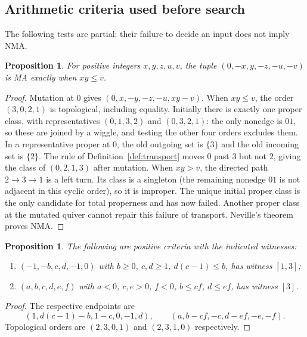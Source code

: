 \documentclass[11pt]{amsart}
\newtheorem{proposition}[theorem]{Proposition}
\theoremstyle{definition}\newtheorem{definition}[theorem]{Definition}
\theoremstyle{remark}\newtheorem{remark}[theorem]{Remark}
\begin{document}
\subsection{Arithmetic criteria used before search}
The following tests are partial: their failure to decide an input does not imply NMA.
\begin{proposition}\label{prop:five}
For positive integers $x,y,z,u,v$, the tuple $(0,-x,y,-z,-u,-v)$ is MA exactly when $xy\le v$.
\end{proposition}
\begin{proof}
Mutation at $0$ gives $(0,x,-y,-z,-u,xy-v)$. When $xy\le v$, the order $(3,0,2,1)$ is topological, including equality. Initially there is exactly one proper class, with representatives $(0,1,3,2)$ and $(0,3,2,1)$: the only nonedge is $01$, so these are joined by a wiggle, and testing the other four orders excludes them. In a representative proper at $0$, the old outgoing set is $\{3\}$ and the old incoming set is $\{2\}$. The rule of Definition~\ref{def:transport} moves $0$ past $3$ but not $2$, giving the class of $(0,2,1,3)$ after mutation. When $xy>v$, the directed path $2\to3\to1$ is a left turn. Its class is a singleton (the remaining nonedge $01$ is not adjacent in this cyclic order), so it is improper. The unique initial proper class is the only candidate for total properness and has now failed. Another proper class at the mutated quiver cannot repair this failure of transport. Neville's theorem proves NMA.
\end{proof}
\begin{proposition}\label{prop:positive}
The following are positive criteria with the indicated witnesses:
\begin{enumerate}[label=(\roman*)]
\item $(-1,-b,c,d,-1,0)$ with $b\ge0$, $c,d\ge1$, $d(c-1)\le b$, has witness $[1,3]$;
\item $(a,b,c,d,e,f)$ with $a<0$, $c,e>0$, $f<0$, $b\le cf$, $d\le ef$, has witness $[3]$.
\end{enumerate}
\end{proposition}
\begin{proof}
The respective endpoints are
\[
 (1,d(c-1)-b,1-c,0,-1,d),\qquad
 (a,b-cf,-c,d-ef,-e,-f).
\]
Topological orders are $(2,3,0,1)$ and $(2,3,1,0)$ respectively.
\end{proof}
\end{document}
